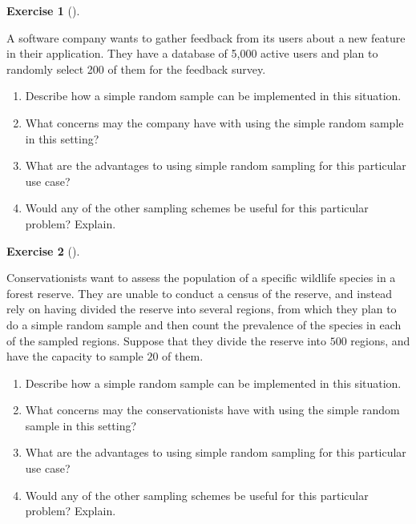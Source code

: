 \documentclass[
  letterpaper,
  DIV=11,
  numbers=noendperiod]{scrreprt}
\providecommand{\tightlist}{%
  \setlength{\itemsep}{0pt}\setlength{\parskip}{0pt}}\usepackage{longtable,booktabs,array}
\theoremstyle{definition}
\newtheorem{exercise}{Exercise}[chapter]
\theoremstyle{definition}
\theoremstyle{definition}
\theoremstyle{remark}
\begin{document}
\begin{exercise}[]\protect\hypertarget{exr-10.8}{}\label{exr-10.8}

A software company wants to gather feedback from its users about a new
feature in their application. They have a database of 5,000 active users
and plan to randomly select 200 of them for the feedback survey.

\begin{enumerate}
\def\labelenumi{\alph{enumi}.}
\tightlist
\item
  Describe how a simple random sample can be implemented in this
  situation.
\item
  What concerns may the company have with using the simple random sample
  in this setting?
\item
  What are the advantages to using simple random sampling for this
  particular use case?
\item
  Would any of the other sampling schemes be useful for this particular
  problem? Explain.
\end{enumerate}

\end{exercise}

\begin{exercise}[]\protect\hypertarget{exr-10.9}{}\label{exr-10.9}

Conservationists want to assess the population of a specific wildlife
species in a forest reserve. They are unable to conduct a census of the
reserve, and instead rely on having divided the reserve into several
regions, from which they plan to do a simple random sample and then
count the prevalence of the species in each of the sampled regions.
Suppose that they divide the reserve into \(500\) regions, and have the
capacity to sample \(20\) of them.

\begin{enumerate}
\def\labelenumi{\alph{enumi}.}
\tightlist
\item
  Describe how a simple random sample can be implemented in this
  situation.
\item
  What concerns may the conservationists have with using the simple
  random sample in this setting?
\item
  What are the advantages to using simple random sampling for this
  particular use case?
\item
  Would any of the other sampling schemes be useful for this particular
  problem? Explain.
\end{enumerate}

\end{exercise}
\end{document}
